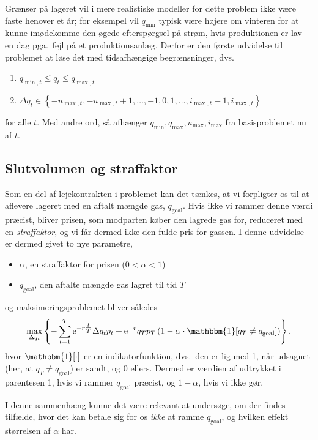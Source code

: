 \documentclass[12pt,oneside,final]{article}
\newcommand{\1}{\mathbbm{1}}
\newcommand{\e}{\mathrm{e}}
\begin{document}
Grænser på lageret vil i mere realistiske modeller for dette problem ikke være faste henover et år;
for eksempel vil \(q_{\min}\) typisk være højere om vinteren for at kunne imødekomme den øgede efterspørgsel på strøm, hvis produktionen er lav en dag pga.\ fejl på et produktionsanlæg.
Derfor er den første udvidelse til problemet at løse det med tidsafhængige begrænsninger, dvs.\
%
\begin{enumerate}
\item \(q_{\min,t} \leq q_{t} \leq q_{\max,t}\)
\item \(\Delta q_{t} \in
    \left\{
    -u_{\max,t} , -u_{\max,t}+1 , \dotsc, -1, 0, 1, \dotsc, i_{\max,t} - 1 , i_{\max,t}
    \right\}\)
\end{enumerate}
%
for alle \(t\).
Med andre ord, så afhænger \(q_{\min}, q_{\max}, u_{\max}, i_{\max}\) fra basisproblemet nu af \(t\).


\subsection{Slutvolumen og straffaktor}

Som en del af lejekontrakten i problemet kan det tænkes, at vi forpligter os til at aflevere lageret med en aftalt mængde gas, \(q_{\mathrm{goal}}\).
Hvis ikke vi rammer denne værdi præcist, bliver prisen, som modparten køber den lagrede gas for, reduceret med en \emph{straffaktor}, og vi får dermed ikke den fulde pris for gassen.
I denne udvidelse er dermed givet to nye parametre,
%
\begin{itemize}
\item \(\alpha\), en straffaktor for prisen (\(0 < \alpha < 1\))
\item \(q_{\mathrm{goal}}\), den aftalte mængde gas lagret til tid \(T\)
\end{itemize}
%
og maksimeringsproblemet bliver således
%
\begin{equation}
  \max_{\Delta q_{t}}
  \left\{
    - \sum_{t = 1}^{T} \e^{-r\tfrac{t}{T}} \Delta q_{t} p_{t} + \e^{-r} q_{T}p_{T}
    \left(
      1 - \alpha \cdot \1 [q_{T} \neq q_{\mathrm{goal}}]
    \right)
  \right\} ,
\end{equation}
%
hvor \(\1[\cdot]\) er en indikatorfunktion, dvs.\ den er lig med 1, når udsagnet (her, at \(q_{T} \neq q_{\mathrm{goal}}\)) er sandt, og 0 ellers.
Dermed er værdien af udtrykket i parentesen 1, hvis vi rammer \(q_{\mathrm{goal}}\) præcist, og \(1 - \alpha\), hvis vi ikke gør.

I denne sammenhæng kunne det være relevant at undersøge, om der findes tilfælde, hvor det kan betale sig for os \emph{ikke} at ramme \(q_{\mathrm{goal}}\), og hvilken effekt størrelsen af \(\alpha\) har.
\end{document}
